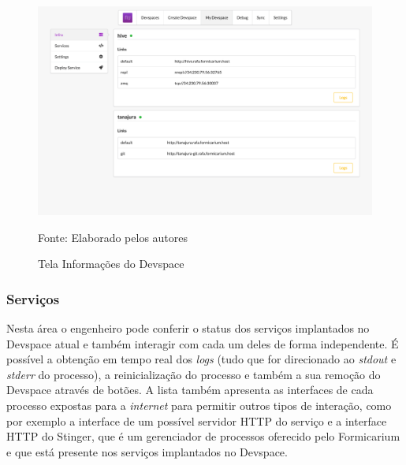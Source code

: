 \documentclass[twosideprint]{politex}
\newcommand{\legend}[1]{\begin{center}\def\caption{}\caption{#1}\end{center}}
\begin{document}
\begin{figure}[htb]
	\caption{\label{fig_frontend_devspace_info}Tela Informações do Devspace}
	\begin{center}
	\includegraphics[width=\textwidth,keepaspectratio]{pictures/frontend/frontend-devspace-info.png}
	\end{center}
	\legend{Fonte: Elaborado pelos autores}
\end{figure}

\subsubsection{Serviços}

Nesta área o engenheiro pode conferir o status dos serviços implantados no Devspace atual e também interagir com cada um deles de forma independente. É possível a obtenção em tempo real dos \textit{logs} (tudo que for direcionado ao \textit{stdout} e \textit{stderr} do processo), a reinicialização do processo e também a sua remoção do Devspace através de botões. A lista também apresenta as interfaces de cada processo expostas para a \textit{internet} para permitir outros tipos de interação, como por exemplo a interface de um possível servidor HTTP do serviço e a interface HTTP do Stinger, que é um gerenciador de processos oferecido pelo Formicarium e que está presente nos serviços implantados no Devspace.
\end{document}
